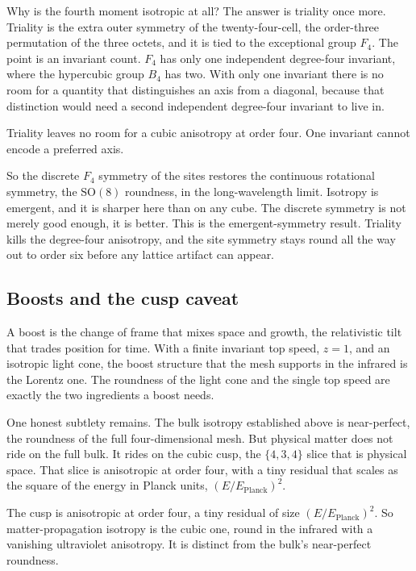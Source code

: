 Why is the fourth moment isotropic at all? The answer is triality once more. Triality is the extra outer symmetry of
the twenty-four-cell, the order-three permutation of the three octets, and it is tied to the exceptional group
$F_4$. The point is an invariant count. $F_4$ has only one independent degree-four invariant, where the hypercubic
group $B_4$ has two. With only one invariant there is no room for a quantity that distinguishes an axis from a
diagonal, because that distinction would need a second independent degree-four invariant to live in.

\begin{principle}
Triality leaves no room for a cubic anisotropy at order four. One invariant cannot encode a preferred axis.
\end{principle}

So the discrete $F_4$ symmetry of the sites restores the continuous rotational symmetry, the $\mathrm{SO}(8)$
roundness, in the long-wavelength limit. Isotropy is emergent, and it is sharper here than on any cube. The discrete
symmetry is not merely good enough, it is better. This is the emergent-symmetry result. Triality kills the
degree-four anisotropy, and the site symmetry stays round all the way out to order six before any lattice artifact
can appear.

\subsection{Boosts and the cusp caveat}

A boost is the change of frame that mixes space and growth, the relativistic tilt that trades position for time. With
a finite invariant top speed, $z = 1$, and an isotropic light cone, the boost structure that the mesh supports in
the infrared is the Lorentz one. The roundness of the light cone and the single top speed are exactly the two
ingredients a boost needs.

One honest subtlety remains. The bulk isotropy established above is near-perfect, the roundness of the full
four-dimensional mesh. But physical matter does not ride on the full bulk. It rides on the cubic cusp, the
$\{4,3,4\}$ slice that is physical space. That slice is anisotropic at order four, with a tiny residual that scales
as the square of the energy in Planck units, $(E / E_{\mathrm{Planck}})^2$.

\begin{result}
The cusp is anisotropic at order four, a tiny residual of size $(E / E_{\mathrm{Planck}})^2$. So matter-propagation
isotropy is the cubic one, round in the infrared with a vanishing ultraviolet anisotropy. It is distinct from the
bulk's near-perfect roundness.
\end{result}

